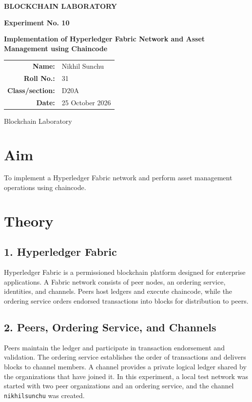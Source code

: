 \documentclass[12pt,a4paper]{article}
\begin{document}
\begin{titlepage}
\centering
\vspace*{1.5cm}
{\Large\bfseries BLOCKCHAIN LABORATORY\par}
\vspace{1.2cm}
{\large\bfseries Experiment No. 10\par}
\vspace{0.8cm}
{\LARGE\bfseries Implementation of Hyperledger Fabric Network and Asset Management using Chaincode\par}
\vspace{1.5cm}
\begin{tabular}{rl}
\textbf{Name:} & Nikhil Sunchu \\[0.6cm]
\textbf{Roll No.:} & 31 \\[0.6cm]
\textbf{Class/section:} & D20A \\[0.6cm]
\textbf{Date:} & 25 October 2026 \\[0.6cm]
\end{tabular}
\vfill
{\large Blockchain Laboratory\par}
\end{titlepage}

\section{Aim}
To implement a Hyperledger Fabric network and perform asset management operations using chaincode.

\section{Theory}
\subsection{1. Hyperledger Fabric}
Hyperledger Fabric is a permissioned blockchain platform designed for enterprise applications. A Fabric network consists of peer nodes, an ordering service, identities, and channels. Peers host ledgers and execute chaincode, while the ordering service orders endorsed transactions into blocks for distribution to peers.

\subsection{2. Peers, Ordering Service, and Channels}
Peers maintain the ledger and participate in transaction endorsement and validation. The ordering service establishes the order of transactions and delivers blocks to channel members. A channel provides a private logical ledger shared by the organizations that have joined it. In this experiment, a local test network was started with two peer organizations and an ordering service, and the channel \texttt{nikhilsunchu} was created.
\end{document}
